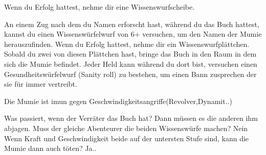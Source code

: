 Wenn du Erfolg hattest, nehme dir eine Wissenswurfscheibe.
    \begin{itemize}
        \bitem An einem Zug nach dem du Namen erforscht hast, während du das Buch hattest, kannst du einen Wissenswürfelwurf von 6+ versuchen, um den Namen der Mumie herauszufinden. Wenn du Erfolg
hattest, nehme dir ein Wissenswurfplättchen.
        \bitem Sobald du zwei von diesen Plättchen hast, bringe das Buch in den Raum in dem sich die Mumie befindet. Jeder Held kann während du dort bist, versuchen einen Gesundheitswürfelwurf (Sanity roll) zu bestehen, um einen Bann zusprechen der sie für immer vertreibt.
    \end{itemize}

    Die Mumie ist imun gegen Geschwindigkeitsangriffe(Revolver,Dynamit..)


Was passiert, wenn der Verräter das Buch hat? Dann müssen es die anderen ihm abjagen.
Muss der gleiche Abenteurer die beiden Wissenswürfe machen? Nein
Wenn Kraft und Geschwindigkeit beide auf der untersten Stufe sind, kann die Mumie dann auch töten? Ja..